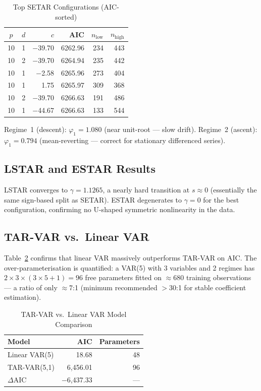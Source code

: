 \documentclass[conference]{IEEEtran}
\begin{document}
\begin{table}[H]
\centering
\caption{Top SETAR Configurations (AIC-sorted)}
\label{tab:setar_top}
\begin{tabular}{ccrrrr}
\toprule
$p$ & $d$ & $c$ & AIC & $n_\text{low}$ & $n_\text{high}$ \\
\midrule
10 & 1 & $-$39.70 & 6262.96 & 234 & 443 \\
10 & 2 & $-$39.70 & 6264.94 & 235 & 442 \\
10 & 1 & $-$2.58  & 6265.96 & 273 & 404 \\
10 & 1 &   1.75   & 6265.97 & 309 & 368 \\
10 & 2 & $-$39.70 & 6266.63 & 191 & 486 \\
10 & 1 & $-$44.67 & 6266.63 & 133 & 544 \\
\bottomrule
\end{tabular}
\end{table}

Regime~1 (descent): $\varphi_1 = 1.080$ (near unit-root --- slow drift).
Regime~2 (ascent): $\varphi_1 = 0.794$ (mean-reverting --- correct for
stationary differenced series).

\subsection{LSTAR and ESTAR Results}

LSTAR converges to $\gamma = 1.1265$, a nearly hard transition at $s \approx 0$
(essentially the same sign-based split as SETAR). ESTAR degenerates to
$\gamma = 0$ for the best configuration, confirming no U-shaped symmetric
nonlinearity in the data.

\subsection{TAR-VAR vs.\ Linear VAR}

Table~\ref{tab:tarvar} confirms that linear VAR massively outperforms TAR-VAR
on AIC. The over-parameterisation is quantified: a VAR(5) with 3 variables and
2 regimes has $2 \times 3 \times (3 \times 5 + 1) = 96$ free parameters fitted
on $\approx$680 training observations --- a ratio of only $\approx$7:1 (minimum
recommended $>$30:1 for stable coefficient estimation).

\begin{table}[H]
\centering
\caption{TAR-VAR vs.\ Linear VAR Model Comparison}
\label{tab:tarvar}
\begin{tabular}{lrr}
\toprule
\textbf{Model} & \textbf{AIC} & \textbf{Parameters} \\
\midrule
Linear VAR(5) & 18.68    & 48 \\
TAR-VAR(5,1)  & 6{,}456.01 & 96 \\
\midrule
$\Delta$AIC   & $-$6{,}437.33 & --- \\
\bottomrule
\end{tabular}
\end{table}
\end{document}
